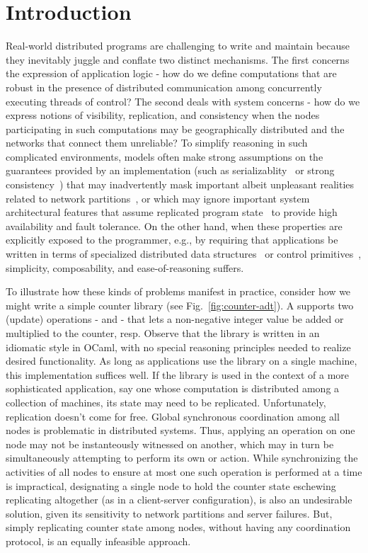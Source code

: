 \section{Introduction}

Real-world distributed programs are challenging to write and maintain
because they inevitably juggle and conflate two distinct mechanisms.
The first concerns the expression of application logic - how do we
define computations that are robust in the presence of distributed
communication among concurrently executing threads of control?  The
second deals with system concerns - how do we express notions of
visibility, replication, and consistency when the nodes participating
in such computations may be geographically distributed and the
networks that connect them unreliable?  To simplify reasoning in such
complicated environments, models often make strong assumptions on the
guarantees provided by an implementation (such as
serializablity~\cite{...} or strong consistency~\cite{...}) that may
inadvertently mask important albeit unpleasant realities related to
network partitions~\cite{...}, or which may ignore important system
architectural features that assume replicated program state~\cite{...}
to provide high availability and fault tolerance.  On the other hand,
when these properties are explicitly exposed to the programmer, e.g.,
by requiring that applications be written in terms of specialized
distributed data structures~\cite{...} or control
primitives~\cite{...}, simplicity, composability, and
ease-of-reasoning suffers.

To illustrate how these kinds of problems manifest in practice,
consider how we might write a simple counter library (see
Fig.~\ref{fig:counter-adt}).  A  supports two (update)
operations -  and  - that lets a non-negative integer
value be added or multiplied to the counter, resp.  Observe that the
library is written in an idiomatic style in OCaml, with no special
reasoning principles needed to realize desired functionality.  As long
as applications use the library on a single machine, this
implementation suffices well.  If the library is used in the context
of a more sophisticated application, say one whose computation is
distributed among a collection of machines, its state may need to be
replicated.  Unfortunately, replication doesn't come for free.  Global
synchronous coordination among all nodes is problematic in distributed
systems.  Thus, applying an  operation on one node may not be
instanteously witnessed on another, which may in turn be
simultaneously attempting to perform its own  or 
action.  While synchronizing the activities of all nodes to ensure at
most one such operation is performed at a time is impractical,
designating a single node to hold the counter state eschewing
replicating altogether (as in a client-server configuration), is also
an undesirable solution, given its sensitivity to network partitions
and server failures.  But, simply replicating counter state among
nodes, without having any coordination protocol, is an equally
infeasible approach.

